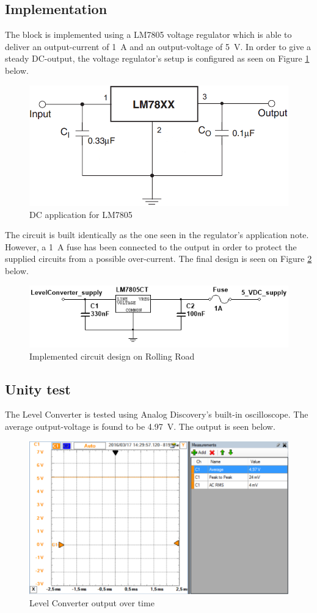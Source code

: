 \subsection{Implementation}
The block is implemented using a LM7805 voltage regulator\cite{LM7805} which is able to deliver an output-current of \SI{1}{\ampere} and an output-voltage of \SI{5}{\volt}. In order to give a steady DC-output, the voltage regulator's setup is configured as seen on Figure \ref{fig:LM7805_app} below.

\begin{figure}[H]
	\centering
	\includegraphics[width=0.4\linewidth]{Hardware/Pictures/LM7805}
	\caption{DC application for LM7805}
	\label{fig:LM7805_app}
\end{figure}

The circuit is built identically as the one seen in the regulator's application note. However, a \SI{1}{\ampere} fuse has been connected to the output in order to protect the supplied circuits from a possible over-current. The final design is seen on Figure \ref{fig:DesignLevelConverter} below.

\begin{figure}[H]
	\centering
	\includegraphics[width=0.7\linewidth]{Hardware/Pictures/DesignLevelConverter}
	\caption{Implemented circuit design on Rolling Road}
	\label{fig:DesignLevelConverter}
\end{figure}

\subsection{Unity test}
The Level Converter is tested using Analog Discovery's built-in oscilloscope. The average output-voltage is found to be \SI{4.97}{\volt}. The output is seen below.

\begin{figure}[H]
	\centering
	\includegraphics[width=0.9\linewidth]{Hardware/Pictures/LevelConverter_test}
	\caption{Level Converter output over time}
	\label{fig:LevelConverter_test}
\end{figure}